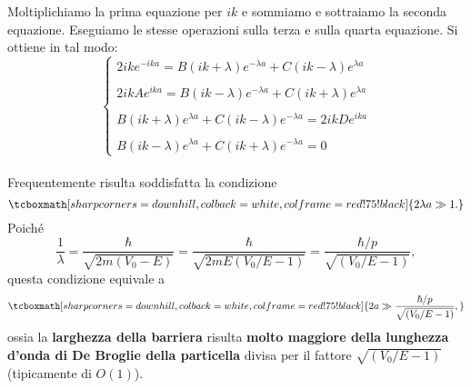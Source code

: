 \documentclass[a4paper,12pt,oneside]{book}
\begin{document}
Moltiplichiamo la prima equazione per $ik$ e sommiamo e sottraiamo la seconda equazione. Eseguiamo le stesse operazioni sulla terza e sulla quarta equazione. Si ottiene in tal modo:
	\begin{equation}
		\begin{cases}
		\displaystyle{2ike^{-ika}= B \left(ik+\lambda\right)e^{-\lambda a} +C \left(ik-\lambda\right)e^{\lambda a} }\\
		\\
		\displaystyle{2ikAe^{ika}= B \left(ik-\lambda\right)e^{-\lambda a} +C \left(ik+\lambda\right)e^{\lambda a} }\\
		\\
		\displaystyle{B\left(ik+\lambda\right)e^{\lambda a} + C\left(ik-\lambda\right)e^{-\lambda a} = 2ikD e^{ika}}\\
		\\
		\displaystyle{B\left(ik-\lambda\right)e^{\lambda a} + C\left(ik+\lambda\right)e^{-\lambda a} =0}
		\end{cases}
	\label{eq:cap10_10}
	\end{equation}\\

Frequentemente risulta soddisfatta la condizione
	\begin{equation}
		\tcboxmath[sharp corners=downhill, colback=white, colframe=red!75!black]{
			2\lambda a \gg 1.
			}
	\end{equation}
Poiché
	\begin{equation}
		\frac{1}{\lambda}=\frac{\hbar}{\sqrt{2m\left(V_0 - E \right)}}=\frac{\hbar}{\sqrt{2mE\left(V_0/E - 1 \right)}}=\frac{\hbar /p}{\sqrt{\left(V_0/E - 1 \right)}},
	\end{equation}
questa condizione equivale a
	\begin{equation}
		\tcboxmath[sharp corners=downhill, colback=white, colframe=red!75!black]{
			2a \gg \frac{\hbar /p}{\sqrt{\left(V_0/E - 1 \right)}},
			}
	\end{equation}
ossia la \textbf{larghezza della barriera} risulta \textbf{molto maggiore della lunghezza d'onda di De Broglie della particella} divisa per il fattore $\sqrt{\left(V_0/E - 1 \right)}$ (tipicamente di $O(1)$).\\
\end{document}
